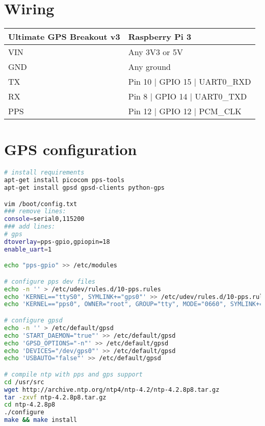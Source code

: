 \section{Wiring}

\begin{center}
    \begin{tabular}{ | l | l | }
    \hline
    \textbf{Ultimate GPS Breakout v3} & \textbf{Raspberry Pi 3} \\ \hline
    VIN & Any 3V3 or 5V \\ \hline
    GND & Any ground \\ \hline
    TX & Pin 10 | GPIO 15 | UART0\_RXD \\ \hline
    RX & Pin  8 | GPIO 14 | UART0\_TXD \\ \hline
    PPS & Pin 12 | GPIO 12 | PCM\_CLK \\ \hline
    \end{tabular}
\end{center}

\section{GPS configuration}

\begin{lstlisting}[label=lst:gps, language=bash, caption=GPS configuration]
# install requirements
apt-get install picocom pps-tools
apt-get install gpsd gpsd-clients python-gps

vim /boot/config.txt
### remove lines:
console=serial0,115200
### add lines:
# gps
dtoverlay=pps-gpio,gpiopin=18
enable_uart=1

echo "pps-gpio" >> /etc/modules

# configure pps dev files
echo -n '' > /etc/udev/rules.d/10-pps.rules
echo 'KERNEL=="ttyS0", SYMLINK+="gps0"' >> /etc/udev/rules.d/10-pps.rules
echo 'KERNEL=="pps0", OWNER="root", GROUP="tty", MODE="0660", SYMLINK+="gpspps0"' >> /etc/udev/rules.d/10-pps.rules

# configure gpsd
echo -n '' > /etc/default/gpsd
echo 'START_DAEMON="true"' >> /etc/default/gpsd
echo 'GPSD_OPTIONS="-n"' >> /etc/default/gpsd
echo 'DEVICES="/dev/gps0"' >> /etc/default/gpsd
echo 'USBAUTO="false"' >> /etc/default/gpsd

# compile ntp with pps and gps support
cd /usr/src
wget http://archive.ntp.org/ntp4/ntp-4.2/ntp-4.2.8p8.tar.gz
tar -zxvf ntp-4.2.8p8.tar.gz
cd ntp-4.2.8p8
./configure
make && make install
\end{lstlisting}
